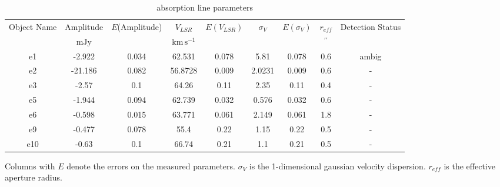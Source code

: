\begin{table*}[htp]
\caption{\formaldehyde \twotwo absorption line parameters}
\begin{tabular}{ccccccccc}
\label{tab:absorption22}
Object Name & Amplitude & $E$(Amplitude) & $V_{LSR}$ & $E(V_{LSR})$ & $\sigma_V$ & $E(\sigma_V)$ & $r_{eff}$ & Detection Status \\
 & $\mathrm{mJy}$ &  & $\mathrm{km\,s^{-1}}$ &  &  &  & $\mathrm{{}^{\prime\prime}}$ &  \\
\hline
e1 & -2.922 & 0.034 & 62.531 & 0.078 & 5.81 & 0.078 & 0.6 & ambig \\
e2 & -21.186 & 0.082 & 56.8728 & 0.009 & 2.0231 & 0.009 & 0.6 & - \\
e3 & -2.57 & 0.1 & 64.26 & 0.11 & 2.35 & 0.11 & 0.4 & - \\
e5 & -1.944 & 0.094 & 62.739 & 0.032 & 0.576 & 0.032 & 0.6 & - \\
e6 & -0.598 & 0.015 & 63.771 & 0.061 & 2.149 & 0.061 & 1.8 & - \\
e9 & -0.477 & 0.078 & 55.4 & 0.22 & 1.15 & 0.22 & 0.5 & - \\
e10 & -0.63 & 0.1 & 66.74 & 0.21 & 1.1 & 0.21 & 0.5 & - \\
\hline
\end{tabular}
\par
Columns with $E$ denote the errors on the measured parameters.  $\sigma_{V}$ is the 1-dimensional gaussian velocity dispersion.  $r_{eff}$ is the effective aperture radius.
\end{table*}
